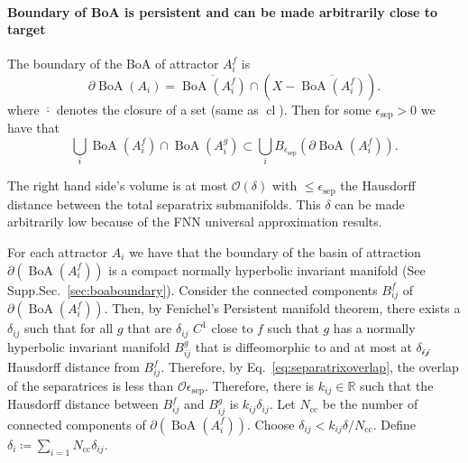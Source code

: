 \documentclass{article}
\theoremstyle{definition}
\theoremstyle{remark}
\newcommand{\reals}{\mathbb{R}}
\newcommand{\cl}{\operatorname{cl}}
\newcommand{\boa}{\operatorname{BoA}}
\newcounter{ct}
\begin{document}
\paragraph{Boundary of BoA is persistent and can be made arbitrarily close to target}%
The boundary of the BoA of attractor $A_i^f$ is %
\[\partial\boa(A_i) = \overline{\boa(A_i^f)} \cap (X - \overline{\boa(A_i^f)}).\]
where \(\overline{\cdot}\) denotes the closure of a set (same as \(\cl\)).
%
Then for some  $\epsilon_{\operatorname{sep}}>0$ we have that 
\begin{equation}\label{eq:separatrixoverlap}
\bigcup_i \boa(A_i^f)\cap\boa(A_i^g) \subset \bigcup_i B_{\epsilon_{\operatorname{sep}}}(\partial\boa(A_i^f)). 
\end{equation}

The right hand side's volume is at most $\mathcal{O}(\delta)$ with $\leq\epsilon_{\operatorname{sep}}$ the Hausdorff distance between the total separatrix submanifolds.
This $\delta$ can be made arbitrarily low because of the FNN universal approximation results.


For each attractor $A_i$ we have that the boundary of the basin of attraction $\partial(\boa(A_i^f))$ is a compact normally hyperbolic invariant manifold (See Supp.Sec.~\ref{sec:boaboundary}).
Consider the connected components $B^f_{ij}$ of $\partial(\boa(A_i^f))$.
Then, by Fenichel's Persistent manifold theorem, there exists a $\delta_{ij}$ such that for all $g$ that are $\delta_{ij}$ $C^1$ close to $f$ such that $g$ has a normally hyperbolic invariant manifold  $B^g_{ij}$ that is diffeomorphic to and at most at $\mathcal{\delta_{ij}}$ Hausdorff distance from $B^f_{ij}$.
Therefore, by Eq.~\ref{eq:separatrixoverlap}, the overlap of the separatrices is less than $\mathcal{O}\epsilon_{\operatorname{sep}}$.%
Therefore, there is $k_{ij}\in\reals$ such that the Hausdorff distance between $B^f_{ij}$ and $B^g_{ij}$ is $k_{ij}\delta_{ij}$.
Let  $N_{\operatorname{cc}}$ be the number of connected components of $\partial(\boa(A_i^f))$.
Choose $\delta_{ij}<k_{ij}\delta/N_{\operatorname{cc}}$.%
Define $\delta_i\coloneqq\sum_{i=1}{N_{\operatorname{cc}}}\delta_{ij}$.
\end{document}
